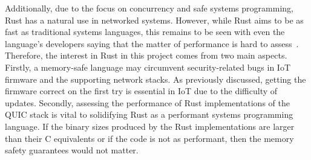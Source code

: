 Additionally, due to the focus on concurrency and safe systems programming, Rust has a natural use in networked systems.
However, while Rust aims to be as fast as traditional systems languages, this remains to be seen with even the language's developers saying that the matter of performance is hard to assess~\cite{rust_faq_2021}. Therefore, the interest in Rust in this project comes from two main aspects.
Firstly, a memory-safe language may circumvent security-related bugs in IoT firmware and the supporting network stacks.
As previously discussed, getting the firmware correct on the first try is essential in IoT due to the difficulty of updates.
Secondly, assessing the performance of Rust implementations of the QUIC stack is vital to solidifying Rust as a performant systems programming language.
If the binary sizes produced by the Rust implementations are larger than their C equivalents or if the code is not as performant, then the memory safety guarantees would not matter.